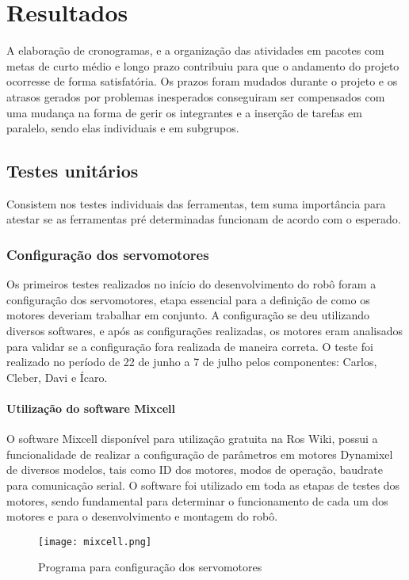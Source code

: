 \chapter{Resultados}
\label{chap:result}
A elaboração de cronogramas, e a organização das atividades em pacotes com metas de curto médio e longo prazo contribuiu para que o andamento do projeto ocorresse de forma satisfatória. Os prazos foram mudados  durante o projeto e os atrasos gerados por problemas inesperados conseguiram ser compensados com uma mudança na forma de gerir os integrantes e a inserção de tarefas em paralelo, sendo elas individuais e em subgrupos.


\section{Testes unitários}
\label{sec:testu}
Consistem nos testes individuais das ferramentas, tem suma importância para atestar se as ferramentas pré determinadas funcionam de acordo com o esperado.


\subsection{Configuração dos servomotores}
Os primeiros testes realizados no início do desenvolvimento do robô foram a configuração dos servomotores, etapa essencial para a definição de como os motores deveriam trabalhar em conjunto. A configuração se deu utilizando diversos softwares, e após as configurações realizadas, os motores eram analisados para validar se a configuração fora realizada de maneira correta.  O teste foi realizado no período de 22 de junho a 7 de julho pelos componentes: Carlos, Cleber, Davi e Ícaro.

\subsubsection{Utilização do software Mixcell}
O software Mixcell disponível para utilização gratuita na Ros Wiki, possui a funcionalidade de realizar a configuração de parâmetros em motores Dynamixel de diversos modelos, tais como ID dos motores, modos de operação, baudrate para comunicação serial. O software foi utilizado em toda as etapas de testes dos motores, sendo fundamental para determinar o funcionamento de cada um dos motores e para o desenvolvimento e montagem do robô.  

\begin{figure}[h!]												
	\centering												
	\texttt{[image: mixcell.png]}				
	\caption{Programa para configuração dos servomotores}		
	\label{img:mixcell}
\end{figure}		

